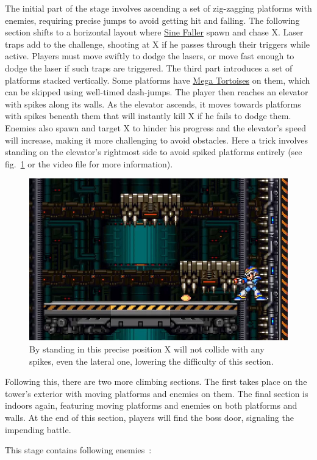 The initial part of the stage involves ascending a set of zig-zagging platforms with enemies, requiring precise jumps to avoid getting hit and falling. The following section shifts to a horizontal layout where \hyperlink{enem:Sine_Faller}{Sine Faller} spawn and chase X. Laser traps add to the challenge, shooting at X if he passes through their triggers while active. Players must move swiftly to dodge the lasers, or move fast enough to dodge the laser if such traps are triggered. The third part introduces a set of platforms stacked vertically. Some platforms have \hyperlink{enem:Mega_Tortoise}{Mega Tortoises} on them, which can be skipped using well-timed dash-jumps. The player then reaches an elevator with spikes along its walls. As the elevator ascends, it moves towards platforms with spikes beneath them that will instantly kill X if he fails to dodge them. Enemies also spawn and target X to hinder his progress and the elevator's speed  will increase, making it more challenging to avoid obstacles. Here a  trick involves standing on the elevator's rightmost side to avoid spiked platforms entirely (see fig.~\ref{tower_spike} or the video file  for more information).
\begin{figure}[htp]
	\centering
	\includegraphics[width=0.5\linewidth]{figures/X1/Boomer_kuwanger/Tower_spike_skip.jpg}
	\caption{By standing in this precise position X will not collide with any spikes, even the lateral one, lowering the difficulty of this section.}
	\label{tower_spike}
\end{figure}
Following this, there are two more climbing sections. The first takes place on the tower's exterior with moving platforms and enemies on them. The final section is indoors again, featuring moving platforms and enemies on both platforms and walls. At the end of this section, players will find the boss door, signaling the impending battle.

This stage contains following enemies~\cite{wiki:Tower}:

